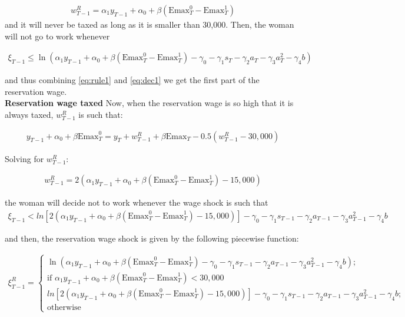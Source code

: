 \documentclass[11pt]{article}
\begin{document}
\begin{align}
	w_{T-1}^R=\alpha_1y_{T-1}+\alpha_0+\beta(\text{Emax}_{T}^0-\text{Emax}_{T}^1)
\end{align}
and it will never be taxed as long as it is smaller than 30,000. Then, the woman will not go to work whenever 

\begin{align}\label{eq:dec1}
	\xi_{T-1}\leq\ln \left(\alpha_1y_{T-1}+\alpha_0+\beta(\text{Emax}_T^0-\text{Emax}_T^1)-\gamma_0-\gamma_1s_{T}-\gamma_2a_{T}-\gamma_3a_{T}^2-\gamma_4b \right)
\end{align}

and thus combining \ref{eq:rule1} and \ref{eq:dec1} we get the first part of the reservation wage. \\
\textbf{Reservation wage taxed}
Now, when the reservation wage is so high that it is always taxed, $w_{T-1}^R$ is such that:

\begin{align}
	y_{T-1}+\alpha_0+\beta\text{Emax}_T^0=y_T+w_{T-1}^R+\beta \text{Emax}_{T}-0.5(w_{T-1}^R-30,000)
\end{align}

Solving for $w_{T-1}^R$:

\begin{align}\label{eq:rule2}
	w_{T-1}^R=2\left(\alpha_1y_{T-1}+\alpha_0+\beta(\text{Emax}_T^0-\text{Emax}_T^1)-15,000 \right)
\end{align}

the woman will decide not to work whenever the wage shock is such that 
\begin{align}\label{eq:dec2}
	\xi_{T-1}< ln\left[2(\alpha_1y_{T-1}+\alpha_0+\beta(\text{Emax}_T^0-\text{Emax}_T^1)-15,000)\right]-\gamma_0-\gamma_1s_{T-1}-\gamma_2a_{T-1}-\gamma_3a_{T-1}^2-\gamma_4b
\end{align}

and then, the reservation wage shock is given by the following piecewise function:
\begin{footnotesize}
\begin{align}
	\xi_{T-1}^R=\begin{cases}
		\ln \left(\alpha_1y_{T-1}+\alpha_0+\beta(\text{Emax}_T^0-\text{Emax}_T^1)-\gamma_0-\gamma_1s_{T-1}-\gamma_2a_{T-1}-\gamma_3a_{T-1}^2-\gamma_4b \right);  \nonumber \\ \text{if  } \alpha_1y_{T-1}+\alpha_0+\beta(\text{Emax}_{T}^0-\text{Emax}_{T}^1)<30,000 \\[0.3in]
		 ln\left[2(\alpha_1y_{T-1}+\alpha_0+\beta(\text{Emax}_T^0-\text{Emax}_T^1)-15,000)\right]-\gamma_0-\gamma_1s_{T-1}-\gamma_2a_{T-1}-\gamma_3a_{T-1}^2-\gamma_4b; \nonumber \\ \text{otherwise}
	\end{cases}
\end{align}
\end{footnotesize}
\end{document}
